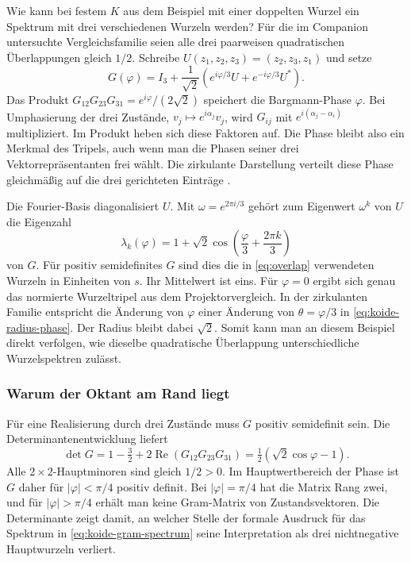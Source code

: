 Wie kann bei festem \(K\) aus dem Beispiel mit einer doppelten
Wurzel ein Spektrum mit drei verschiedenen Wurzeln werden? Für die
im Companion untersuchte Vergleichsfamilie seien alle drei
paarweisen quadratischen Überlappungen gleich \(1/2\). Schreibe
\(U(z_1,z_2,z_3)=(z_2,z_3,z_1)\) und setze
\begin{equation}
 G(\varphi)=I_3+\frac1{\sqrt2}\left(
   e^{i\varphi/3}U+e^{-i\varphi/3}U^*\right).
 \label{eq:koide-circulant-gram}
\end{equation}
Das Produkt \(G_{12}G_{23}G_{31}=e^{i\varphi}/(2\sqrt2)\)
speichert die Bargmann-Phase \(\varphi\). Bei Umphasierung der
drei Zustände, \(v_j\mapsto e^{i\alpha_j}v_j\), wird
\(G_{ij}\) mit \(e^{i(\alpha_j-\alpha_i)}\) multipliziert.
Im Produkt heben sich diese Faktoren auf. Die Phase bleibt also
ein Merkmal des Tripels, auch wenn man die Phasen seiner drei
Vektorrepräsentanten frei wählt. Die zirkulante Darstellung
verteilt diese Phase gleichmäßig auf die drei gerichteten
Einträge \cite{physics,companion}.

Die Fourier-Basis diagonalisiert \(U\). Mit
\(\omega=e^{2\pi i/3}\) gehört zum Eigenwert \(\omega^k\) von
\(U\) die Eigenzahl
\begin{equation}
 \lambda_k(\varphi)=1+\sqrt2\cos\left(\frac{\varphi}{3}
                                     +\frac{2\pi k}{3}\right)
 \label{eq:koide-gram-spectrum}
\end{equation}
von \(G\). Für positiv semidefinites \(G\) sind dies
die in \eqref{eq:overlap} verwendeten Wurzeln in Einheiten von
\(s\). Ihr Mittelwert ist eins. Für \(\varphi=0\) ergibt sich
genau das normierte Wurzeltripel aus dem Projektorvergleich. In
der zirkulanten Familie entspricht die Änderung von \(\varphi\)
einer Änderung von \(\theta=\varphi/3\) in
\eqref{eq:koide-radius-phase}. Der Radius bleibt dabei \(\sqrt2\).
Somit kann man an diesem Beispiel direkt verfolgen, wie dieselbe
quadratische Überlappung unterschiedliche Wurzelspektren zulässt.

\subsubsection{Warum der Oktant am Rand liegt}

Für eine Realisierung durch drei Zustände muss \(G\) positiv
semidefinit sein. Die Determinantenentwicklung liefert
\begin{equation}
 \det G=1-\tfrac32+2\operatorname{Re}(G_{12}G_{23}G_{31})
       =\tfrac12(\sqrt2\cos\varphi-1).
 \label{eq:det}
\end{equation}
Alle \(2\times2\)-Hauptminoren sind gleich \(1/2>0\).
Im Hauptwertbereich der Phase ist \(G\) daher für
\(|\varphi|<\pi/4\) positiv definit. Bei \(|\varphi|=\pi/4\)
hat die Matrix Rang zwei, und für \(|\varphi|>\pi/4\) erhält
man keine Gram-Matrix von Zustandsvektoren. Die Determinante
zeigt damit, an welcher Stelle der formale Ausdruck für das
Spektrum in \eqref{eq:koide-gram-spectrum} seine Interpretation
als drei nichtnegative Hauptwurzeln verliert.

